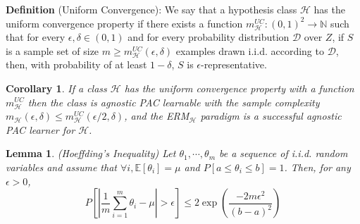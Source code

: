 \documentclass{article}
\newtheorem{corollary}{Corollary}
\newtheorem{lemma}{Lemma}
\begin{document}
\noindent\textbf{Definition} (Uniform Convergence): We say that a hypothesis class $\mathcal{H}$ has the uniform convergence property if there exists a function $m^{UC}_\mathcal{H}:(0,1)^2\rightarrow \mathbb{N}$ such that for every $\epsilon,\delta \in (0, 1)$ and for every probability distribution $\mathcal{D}$ over $Z$, if $S$ is a sample set of size $m\geq m^{UC}_\mathcal{H}(\epsilon, \delta)$ examples drawn i.i.d. according to $\mathcal{D}$, then, with probability of at least $1-\delta$, $S$ is $\epsilon$-representative.

	\begin{corollary}
	If a class $\mathcal{H}$ has the uniform convergence property with a function $m^{UC}_\mathcal{H}$ then the class is agnostic PAC learnable with the sample complexity $m_\mathcal{H}(\epsilon,\delta)\leq m^{UC}_\mathcal{H}(\epsilon/2,\delta)$, and the ERM$_\mathcal{H}$ paradigm is a successful agnostic PAC learner for $\mathcal{H}$.
	\end{corollary}
	
	\begin{lemma}
	(Hoeffding's Inequality) Let $\theta_1,\cdots,\theta_m$ be a sequence of i.i.d. random variables and assume that $\forall i, \mathbb{E}[\theta_i]=\mu$ and $P[a\leq\theta_i\leq b]=1$. Then, for any $\epsilon>0$,
	\begin{equation*}
	P\left[\left| \frac{1}{m}\sum_{i=1}^m\theta_i - \mu \right| >\epsilon \right] \leq 2 \exp \left( \frac{-2m\epsilon^2 }{(b-a)^2} \right)
	\end{equation*}
	\end{lemma}
\end{document}
